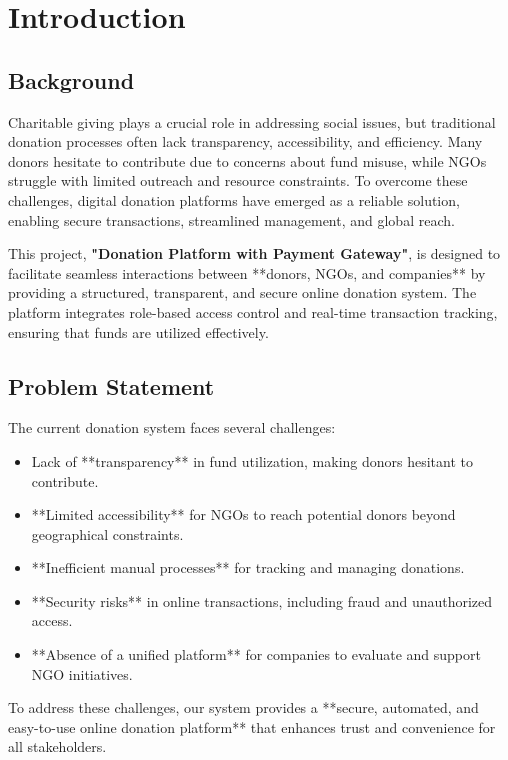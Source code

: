 \chapter{Introduction}

\section{Background}
Charitable giving plays a crucial role in addressing social issues, but traditional donation processes often lack transparency, accessibility, and efficiency. Many donors hesitate to contribute due to concerns about fund misuse, while NGOs struggle with limited outreach and resource constraints. To overcome these challenges, digital donation platforms have emerged as a reliable solution, enabling secure transactions, streamlined management, and global reach.  

This project, \textbf{"Donation Platform with Payment Gateway"}, is designed to facilitate seamless interactions between **donors, NGOs, and companies** by providing a structured, transparent, and secure online donation system. The platform integrates role-based access control and real-time transaction tracking, ensuring that funds are utilized effectively.  

\section{Problem Statement}
The current donation system faces several challenges:
\begin{itemize}
    \item Lack of **transparency** in fund utilization, making donors hesitant to contribute.
    \item **Limited accessibility** for NGOs to reach potential donors beyond geographical constraints.
    \item **Inefficient manual processes** for tracking and managing donations.
    \item **Security risks** in online transactions, including fraud and unauthorized access.
    \item **Absence of a unified platform** for companies to evaluate and support NGO initiatives.
\end{itemize}

To address these challenges, our system provides a **secure, automated, and easy-to-use online donation platform** that enhances trust and convenience for all stakeholders.

